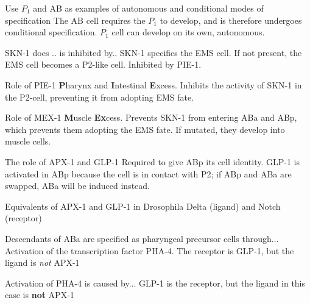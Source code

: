 \begin{flashcard}[Definition]{Use $P_1$ and AB as examples of autonomous and conditional modes of specification}
    The AB cell requires the $P_1$ to develop, and is therefore undergoes conditional specification. $P_1$ cell can develop on its own, autonomous. 
\end{flashcard}

\begin{flashcard}{SKN-1 does .. is inhibited by..}
    SKN-1 specifies the EMS cell. If not present, the EMS cell becomes a P2-like cell. Inhibited by PIE-1. 
\end{flashcard}
    
\begin{flashcard}{Role of PIE-1}
    \textbf{P}harynx and \textbf{I}ntestinal \textbf{E}xcess. Inhibits the activity of SKN-1 in the P2-cell, preventing it from adopting EMS fate. 
\end{flashcard}

\begin{flashcard}{Role of MEX-1}
    \textbf{M}uscle \textbf{Ex}cess. Prevents SKN-1 from entering ABa and ABp, which prevents them adopting the EMS fate. If mutated, they develop into muscle cells.
\end{flashcard}






\begin{flashcard}{The role of APX-1 and GLP-1}
    Required to give ABp its cell identity. GLP-1 is activated in ABp because the cell is in contact with P2; if ABp and ABa are swapped, ABa will be induced instead.
\end{flashcard}

\begin{flashcard}{Equivalents of APX-1 and GLP-1 in Drosophila}
    Delta (ligand) and Notch (receptor)
\end{flashcard}

\begin{flashcard}{Descendants of ABa are specified as pharyngeal precursor cells through...}
     Activation of the transcription factor PHA-4. The receptor is GLP-1, but the ligand is \textit{not} APX-1
\end{flashcard}

\begin{flashcard}{Activation of PHA-4 is caused by...}
    GLP-1 is the receptor, but the ligand in this case is \textbf{not} APX-1
\end{flashcard}

